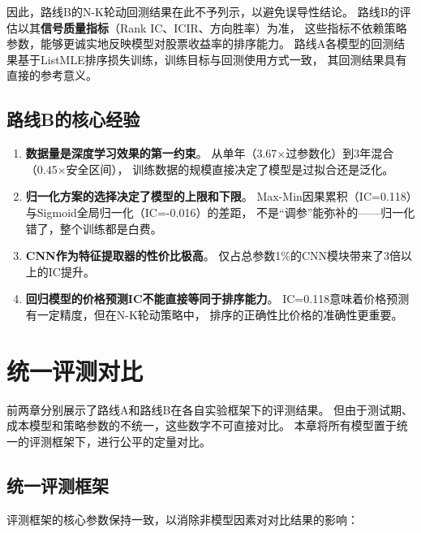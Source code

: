 \documentclass[12pt,a4paper]{ctexart}
\begin{document}
因此，路线B的N-K轮动回测结果在此不予列示，以避免误导性结论。
路线B的评估以其\textbf{信号质量指标}（Rank IC、ICIR、方向胜率）为准，
这些指标不依赖策略参数，能够更诚实地反映模型对股票收益率的排序能力。
路线A各模型的回测结果基于ListMLE排序损失训练，训练目标与回测使用方式一致，
其回测结果具有直接的参考意义。

\subsection{路线B的核心经验}

\begin{enumerate}[leftmargin=*]
    \item \textbf{数据量是深度学习效果的第一约束}。
          从单年（3.67$\times$过参数化）到3年混合（0.45$\times$安全区间），
          训练数据的规模直接决定了模型是过拟合还是泛化。
    \item \textbf{归一化方案的选择决定了模型的上限和下限}。
          Max-Min因果累积（IC=0.118）与Sigmoid全局归一化（IC=-0.016）的差距，
          不是“调参”能弥补的——归一化错了，整个训练都是白费。
    \item \textbf{CNN作为特征提取器的性价比极高}。
          仅占总参数1\%的CNN模块带来了3倍以上的IC提升。
    \item \textbf{回归模型的价格预测IC不能直接等同于排序能力}。
          IC=0.118意味着价格预测有一定精度，但在N-K轮动策略中，
          排序的正确性比价格的准确性更重要。
\end{enumerate}

\section{统一评测对比}

前两章分别展示了路线A和路线B在各自实验框架下的评测结果。
但由于测试期、成本模型和策略参数的不统一，这些数字不可直接对比。
本章将所有模型置于统一的评测框架下，进行公平的定量对比。

\subsection{统一评测框架}

评测框架的核心参数保持一致，以消除非模型因素对对比结果的影响：
\end{document}
